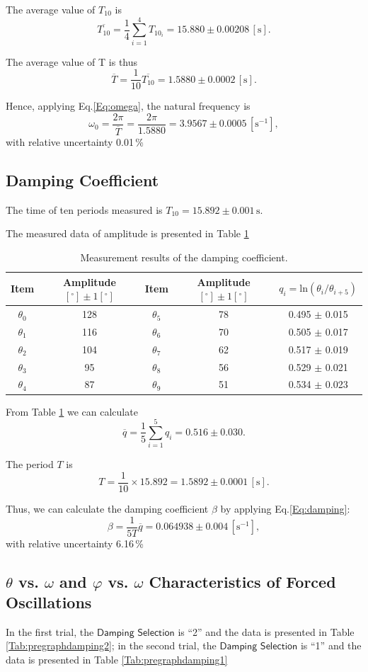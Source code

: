 \documentclass[a4paper]{article}
\begin{document}
The average value of $T_{10}$ is 
\[\overline{T_{10}} = \frac{1}{4} \sum \limits_{i=1}^{4} T_{10_{i}} = 15.880 \pm 0.00208\,[\text{s}].\]

The average value of T is thus
\[\overline{T} = \frac{1}{10} \overline{T_{10}} = 1.5880 \pm 0.0002\,[\text{s}].\]

Hence, applying Eq.\ref{Eq:omega}, the natural frequency is 
\[\omega_{0} = \frac{2\pi}{\overline{T}} = \frac{2\pi}{1.5880} = 3.9567 \pm 0.0005\,[\text{s}^{-1}],\]
with relative uncertainty 0.01\,\%


\subsection{Damping Coefficient}

The time of ten periods measured is $T_{10} = 15.892 \pm 0.001 \,\text{s}.$

The measured data of amplitude is presented in Table \ref{Tab:damping}
\begin{table}[htbp]
\centering
\begin{tabular}{cc|cc|c}
\toprule
Item & Amplitude$[^\circ]\pm 1[^\circ]$ &Item & Amplitude$[^\circ]\pm 1[^\circ]$ & $q_i=\text{ln}(\theta_i/\theta_{i+5})$\\
\midrule
$\theta_0$ & 128 & $\theta_5$ & 78 & 0.495 $\pm$ 0.015\\
$\theta_1$ & 116 & $\theta_6$ & 70 & 0.505 $\pm$ 0.017\\
$\theta_2$ & 104 & $\theta_7$ & 62 & 0.517 $\pm$ 0.019\\
$\theta_3$ & 95 & $\theta_8$ & 56 & 0.529 $\pm$ 0.021\\
$\theta_4$ & 87 & $\theta_9$ & 51 & 0.534 $\pm$ 0.023\\
\bottomrule
\end{tabular}
\caption{Measurement results of the damping coefficient.}\label{Tab:damping}
\end{table}

From Table \ref{Tab:damping} we can calculate
\[\overline{q} = \frac{1}{5} \sum \limits_{i=1}^{5} q_i = 0.516 \pm 0.030.\]

The period $T$ is
\[T = \frac{1}{10}\times 15.892 = 1.5892 \pm 0.0001\,[\text{s}].\]

Thus, we can calculate the damping coefficient $\beta$ by applying Eq.\ref{Eq:damping}:
\[\beta=\frac{1}{5 T} \overline{q} = 0.064938 \pm 0.004\,[\text{s}^{-1}],\]
with relative uncertainty 6.16\,\%


\subsection{$\theta$ vs. $\omega$ and $\varphi$ vs. $\omega$ Characteristics of Forced Oscillations}
In the first trial, the $\textsf{Damping Selection}$ is ``2'' and the data is presented in Table \ref{Tab:pregraphdamping2}; in the second trial, the $\textsf{Damping Selection}$ is ``1'' and the data is presented in Table \ref{Tab:pregraphdamping1} 
\end{document}
